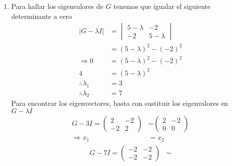 \documentclass[12pt, letterpaper]{article}
\begin{document}
\begin{enumerate}
\begin{equation*}
\begin{pmatrix}
                2 \\
                3
            \end{pmatrix}
        \right\}, \dim B = 1
    \end{equation*}
    \item Para hallar los eigenvalores de $G$ tenemos que igualar el siguiente determinante a cero
    \begin{equation*}
        \begin{aligned}
            |G - \lambda I|
            & = \begin{vmatrix}
                5-\lambda & -2 \\
                -2 & 5-\lambda
            \end{vmatrix} \\
            & = (5-\lambda)^2 - (-2)^2 \\
            \Rightarrow 0 & = (5-\lambda)^2 - (-2)^2 \\
            4 & = (5-\lambda)^2 \\
            \therefore \lambda_{1} & = 3 \\
            \therefore \lambda_{2} & = 7
        \end{aligned}
    \end{equation*}
    Para encontrar los eigenvectores, basta con sustituir los eigenvalores en $G-\lambda I$
    \begin{equation*}
        \begin{aligned}
            G - 3I =
            \begin{pmatrix}
                2 & -2 \\
                -2 & 2
            \end{pmatrix}
            & \sim
            \begin{pmatrix}
                2 & -2 \\
                0 & 0
            \end{pmatrix} \\
            \Rightarrow x_{1} & = x_{2}
        \end{aligned}
    \end{equation*}
    \begin{equation*}
        \begin{aligned}
            G - 7I =
            \begin{pmatrix}
                -2 & -2 \\
                -2 & -2
            \end{pmatrix}
            & \sim

\end{aligned}
\end{equation*}
\end{enumerate}
\end{document}
